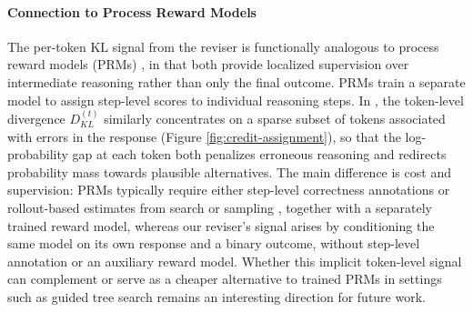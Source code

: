 \paragraph{Connection to Process Reward Models}
The per-token KL signal from the reviser is functionally analogous to process reward models (PRMs) \citep{lightman2024lets, wang-etal-2024-math}, in that both provide localized supervision over intermediate reasoning rather than only the final outcome.
PRMs train a separate model to assign step-level scores to individual reasoning steps.
In \ours{}, the token-level divergence $D^{(t)}_{KL}$ similarly concentrates on a sparse subset of tokens associated with errors in the response (Figure \ref{fig:credit-assignment}), so that the log-probability gap at each token both penalizes erroneous reasoning and redirects probability mass towards plausible alternatives. The main difference is cost and supervision: PRMs typically require either step-level correctness annotations \citep{lightman2024lets} or rollout-based estimates from search or sampling \citep{wang-etal-2024-math}, together with a separately trained reward model, whereas our reviser's signal arises by conditioning the same model on its own response and a binary outcome, without step-level annotation or an auxiliary reward model. Whether this implicit token-level signal can complement or serve as a cheaper alternative to trained PRMs in settings such as guided tree search remains an interesting direction for future work. 



